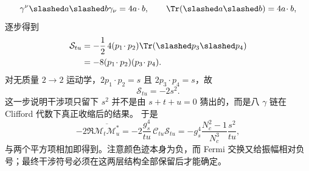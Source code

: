 \begin{derivation}[相同夸克散射的交换干涉]
\begin{equation*}
\gamma^\nu\slashed a\slashed b\gamma_\nu=4a\!\cdot b,
\qquad
\Tr(\slashed a\slashed b)=4a\!\cdot b,
\end{equation*}
逐步得到
\begin{align*}
\mathcal S_{tu}
&=-\frac12\,4(p_1\!\cdot p_2)\Tr(\slashed p_3\slashed p_4)\\
&=-8(p_1\!\cdot p_2)(p_3\!\cdot p_4).
\end{align*}
对无质量 $2\to2$ 运动学，$2p_1\!\cdot p_2=s$ 且 $2p_3\!\cdot p_4=s$，故
\begin{equation*}
\boxed{\mathcal S_{tu}=-2s^2.}
\end{equation*}
这一步说明干涉项只留下 $s^2$ 并不是由 $s+t+u=0$ 猜出的，而是八 $\gamma$ 链在 Clifford 代数下真正收缩后的结果。
于是
\begin{equation*}
-2\Re\overline{\mathcal M_t\mathcal M_u^*}
=-2\frac{g_s^4}{tu}\,\mathcal C_{tu}\mathcal S_{tu}
=-g_s^4\frac{N_c^2-1}{N_c^3}\frac{s^2}{tu},
\end{equation*}
与两个平方项相加即得到。注意颜色迹本身为负，而 Fermi 交换又给振幅相对负号；最终干涉符号必须在这两层结构全部保留后才能确定。
\end{derivation}



